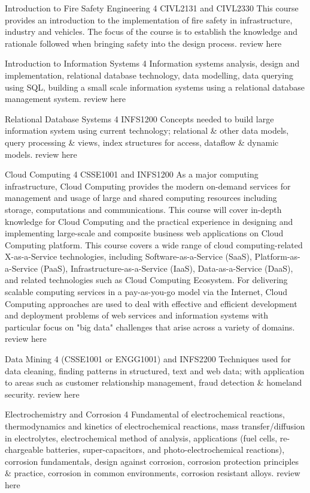 	{Introduction to Fire Safety Engineering}
	{4}
	{CIVL2131 and CIVL2330}
	{}
	{}
	{This course provides an introduction to the implementation of fire safety in infrastructure, industry and vehicles. The focus of the course is to establish the knowledge and rationale followed when bringing safety into the design process.}
	{review here}

	{Introduction to Information Systems}
	{4}
	{}
	{}
	{}
	{Information systems analysis, design and implementation, relational database technology, data modelling, data querying using SQL, building a small scale information systems using a relational database management system.}
	{review here}

	{Relational Database Systems}
	{4}
	{INFS1200}
	{}
	{}
	{Concepts needed to build large information system using current technology; relational \& other data models, query processing \& views, index structures for access, dataflow \& dynamic models.}
	{review here}

	{Cloud Computing}
	{4}
	{CSSE1001 and INFS1200}
	{}
	{}
	{As a major computing infrastructure, Cloud Computing provides the modern on-demand services for management and usage of large and shared computing resources including storage, computations and communications. This course will cover in-depth knowledge for Cloud Computing and the practical experience in designing and implementing large-scale and composite business web applications on Cloud Computing platform. This course covers a wide range of cloud computing-related X-as-a-Service technologies, including Software-as-a-Service (SaaS), Platform-as-a-Service (PaaS), Infrastructure-as-a-Service (IaaS), Data-as-a-Service (DaaS), and related technologies such as Cloud Computing Ecosystem. For delivering scalable computing services in a pay-as-you-go model via the Internet, Cloud Computing approaches are used to deal with effective and efficient development and deployment problems of web services and information systems with particular focus on "big data" challenges that arise across a variety of domains.}
	{review here}

	{Data Mining}
	{4}
	{(CSSE1001 or ENGG1001) and INFS2200}
	{}
	{}
	{Techniques used for data cleaning, finding patterns in structured, text and web data; with application to areas such as customer relationship management, fraud detection \& homeland security.}
	{review here}

	{Electrochemistry and Corrosion}
	{4}
	{}
	{}
	{}
	{Fundamental of electrochemical reactions, thermodynamics and kinetics of electrochemical reactions, mass transfer/diffusion in electrolytes, electrochemical method of analysis, applications (fuel cells, re-chargeable batteries, super-capacitors, and photo-electrochemical reactions), corrosion fundamentals, design against corrosion, corrosion protection principles \& practice, corrosion in common environments, corrosion resistant alloys.}
	{review here}

